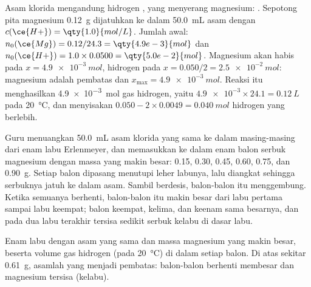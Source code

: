 \begin{example}\label{ex:g10:reaction-progress-table:magnesium}
Asam klorida mengandung  hidrogen , yang menyerang magnesium:
. Sepotong pita magnesium \qty{0.12}{g}
dijatuhkan ke dalam \qty{50.0}{mL} asam dengan
$c(\ce{H+}) = \qty{1.0}{mol/L}$. Jumlah awal:
$n_0(\ce{Mg}) = 0.12/24.3 = \qty{4.9e-3}{mol}$ dan
$n_0(\ce{H+}) = 1.0 \times 0.0500 = \qty{5.0e-2}{mol}$. Magnesium akan
habis pada $x = \qty{4.9e-3}{mol}$,  hidrogen pada
$x = 0.050/2 = \qty{2.5e-2}{mol}$: magnesium adalah pembatas dan
$x_{\max} = \qty{4.9e-3}{mol}$. Reaksi itu menghasilkan \qty{4.9e-3}{mol}
gas hidrogen, yaitu $\num{4.9e-3} \times 24.1 = \qty{0.12}{L}$ pada
\qty{20}{\celsius}, dan menyisakan $0.050 - 2 \times 0.0049 =
\qty{0.040}{mol}$  hidrogen yang berlebih.
\end{example}

\begin{inthelab}
Guru menuangkan \qty{50.0}{mL} asam klorida yang sama ke dalam masing-masing
dari enam labu Erlenmeyer, dan memasukkan ke dalam enam balon serbuk
magnesium dengan massa yang makin besar: 0.15, 0.30, 0.45, 0.60, 0.75,
dan \qty{0.90}{g}. Setiap balon dipasang menutupi leher labunya, lalu
diangkat sehingga serbuknya jatuh ke dalam asam. Sambil berdesis,
balon-balon itu menggembung. Ketika semuanya berhenti, balon-balon itu
makin besar dari labu pertama sampai labu keempat; balon keempat,
kelima, dan keenam sama besarnya, dan pada dua labu terakhir tersisa
sedikit serbuk kelabu di dasar labu.
\end{inthelab}

\begin{omfigure}

{\small Enam labu dengan asam yang sama dan massa magnesium yang makin
besar, beserta volume gas hidrogen (pada \qty{20}{\celsius}) di dalam
setiap balon. Di atas sekitar \qty{0.61}{g}, asamlah yang menjadi
pembatas: balon-balon berhenti membesar dan magnesium tersisa
(kelabu).}
\end{omfigure}

